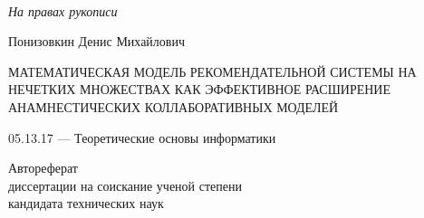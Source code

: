 \begin{titlepage}
\begin{center}
\textsc{}\\
\end{center}
\vspace{1.5cm}
\begin{flushright}
{\it На правах рукописи}
\end{flushright}
\vspace{3.5cm}
\begin{center}
{Понизовкин Денис Михайлович}
\par
\vspace{2cm}
\textsc{
МАТЕМАТИЧЕСКАЯ МОДЕЛЬ РЕКОМЕНДАТЕЛЬНОЙ СИСТЕМЫ НА НЕЧЕТКИХ МНОЖЕСТВАХ КАК
	ЭФФЕКТИВНОЕ РАСШИРЕНИЕ АНАМНЕСТИЧЕСКИХ КОЛЛАБОРАТИВНЫХ МОДЕЛЕЙ
	}
\par
\vspace{2cm}
{05.13.17 --- Теоретические основы информатики}
\par
\vspace{2cm}
{Автореферат\\
диссертации на соискание ученой степени\\
кандидата технических наук}
\end{center}
\par
\vspace{3.5cm}
\begin{center}
\end{center}
\end{titlepage}





